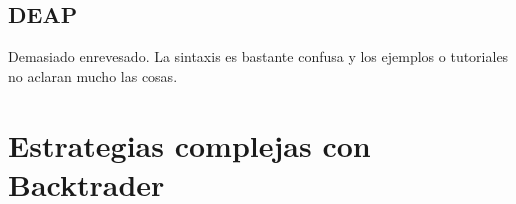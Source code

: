\documentclass[12pt,a4paper]{article}
\begin{document}
		
		\subsection{DEAP}
	
		Demasiado enrevesado. La sintaxis es bastante confusa y los ejemplos o tutoriales no aclaran mucho las cosas.
	
	\newpage
	\section{Estrategias complejas con Backtrader}\label{sec:deep_backtrader}	
	
	
	
		
\newpage



\end{document}
